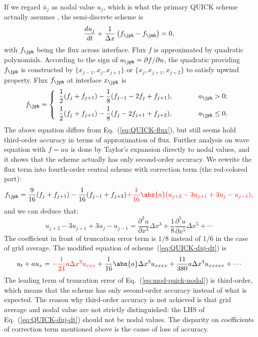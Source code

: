 \documentclass[]{article}
\begin{document}
If we regard $\bar u_j$ as nodal value $u_j$, which is what the primary QUICK
scheme actually assumes \cite{leonard1979stable}, the semi-discrete scheme is
\begin{equation}
  \frac{d u_j}{d t}+\frac{1}{\Delta x}\left(f_{\jph}-f_{\jmh}\right)=0,
  \label{eq:QUICK-duj-dt}
\end{equation}
with $f_\jph$ being the flux across interface. Flux $f$ is approximated by
quadratic polynomials. According to the sign of $a_\jph = \partial f/\partial
u$, the quadratic providing $f_\jph$ is constructed by $\{ x_{j-1}, x_j,
x_{j+1}
\}$ or $\{ x_j, x_{j+1}, x_{j+2} \}$ to satisfy upwind
property. Flux $f_\jph$ at interface $x_\jph$ is
\begin{equation*}
  f_{\jph}=\left\{\begin{array}{ll}
  \displaystyle
  \frac{1}{2}(f_j+f_{j+1})-\frac{1}{8}(f_{j-1}-2f_j+f_{j+1}),\hspace{1cm} & a_{\jph}>0;\\[3mm]
  \displaystyle
  \frac{1}{2}(f_j+f_{j+1})-\frac{1}{8}(f_j-2f_{j+1}+f_{j+2}),\hspace{1cm} & a_{\jph}\le 0.\\
  \end{array}\right.
\end{equation*}
The above equation differs from Eq.~(\ref{eq:QUICK-flux}), but still seems hold
third-order accuracy in terms of approximation of flux. Further analysis on wave
equation with $f=au$ is done
by Taylor's expansion directly to nodal values, and it shows that the scheme
actually has only second-order accuracy. We rewrite the flux term into
fourth-order central scheme with correction term (the red-colored part):
\begin{equation}
  f_{\jph}=\frac{9}{16}(f_j+f_{j+1})-\frac{1}{16}(f_{j-1}+f_{j+2}){\color{red}+\frac{1}{16}\abs{a}(u_{j+2}-3u_{j+1}+3u_{j}-u_{j-1})},
  \label{eq:QUICK-flux-nodal}
\end{equation}
and we can deduce that:
\[
u_{j+2}-3u_{j+1}+3u_{j}-u_{j-1}=\frac{\partial^3 u}{\partial x^3}\Delta x^3+\frac{1}{8}\frac{\partial^5 u}{\partial x^5}\Delta x^5+\cdots
\]
The coefficient in front of truncation error term is $1/8$ instead of $1/6$ in
the case of grid average. The modified equation of
scheme~(\ref{eq:QUICK-duj-dt}) is 
\begin{equation}
  u_t+au_x={\color{red}-\frac{1}{24}a\Delta x^2 u_{xxx}}+\frac{1}{16}\abs{a}\Delta x^3 u_{xxxx}+\frac{11}{380}a\Delta x^4 u_{xxxxx} +\cdots
  \label{eq:mod-quick-nodal}
\end{equation}
The leading term of truncation error of Eq.~(\ref{eq:mod-quick-nodal}) is
third-order, which means that the scheme has only second-order accuracy instead
of what is expected. The reason why third-order accuracy is not achieved is that
grid average and nodal value are not strictly distinguished: the LHS of
Eq.~(\ref{eq:QUICK-duj-dt}) should not be nodal values. The disparity on
coefficients of correction term mentioned above is the cause of loss of
accuracy.
\end{document}
